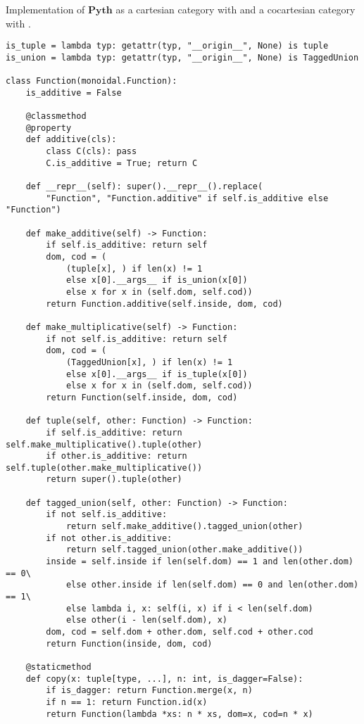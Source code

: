 \begin{python}\label{listing:python-co-cartesian}
{\normalfont Implementation of $\mathbf{Pyth}$ as a cartesian category with  and a cocartesian category with .}

\begin{verbatim}
is_tuple = lambda typ: getattr(typ, "__origin__", None) is tuple
is_union = lambda typ: getattr(typ, "__origin__", None) is TaggedUnion

class Function(monoidal.Function):
    is_additive = False

    @classmethod
    @property
    def additive(cls):
        class C(cls): pass
        C.is_additive = True; return C

    def __repr__(self): super().__repr__().replace(
        "Function", "Function.additive" if self.is_additive else "Function")

    def make_additive(self) -> Function:
        if self.is_additive: return self
        dom, cod = (
            (tuple[x], ) if len(x) != 1
            else x[0].__args__ if is_union(x[0])
            else x for x in (self.dom, self.cod))
        return Function.additive(self.inside, dom, cod)

    def make_multiplicative(self) -> Function:
        if not self.is_additive: return self
        dom, cod = (
            (TaggedUnion[x], ) if len(x) != 1
            else x[0].__args__ if is_tuple(x[0])
            else x for x in (self.dom, self.cod))
        return Function(self.inside, dom, cod)

    def tuple(self, other: Function) -> Function:
        if self.is_additive: return self.make_multiplicative().tuple(other)
        if other.is_additive: return self.tuple(other.make_multiplicative())
        return super().tuple(other)

    def tagged_union(self, other: Function) -> Function:
        if not self.is_additive:
            return self.make_additive().tagged_union(other)
        if not other.is_additive:
            return self.tagged_union(other.make_additive())
        inside = self.inside if len(self.dom) == 1 and len(other.dom) == 0\
            else other.inside if len(self.dom) == 0 and len(other.dom) == 1\
            else lambda i, x: self(i, x) if i < len(self.dom)
            else other(i - len(self.dom), x)
        dom, cod = self.dom + other.dom, self.cod + other.cod
        return Function(inside, dom, cod)

    @staticmethod
    def copy(x: tuple[type, ...], n: int, is_dagger=False):
        if is_dagger: return Function.merge(x, n)
        if n == 1: return Function.id(x)
        return Function(lambda *xs: n * xs, dom=x, cod=n * x)


\end{verbatim}
\end{python}

